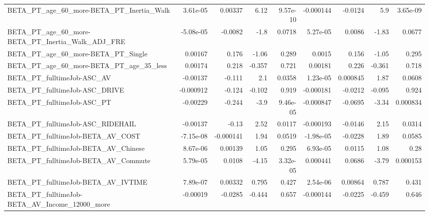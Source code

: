 \begin{tabular}{lrrrrrrrr}
BETA\_PT\_age\_60\_more-BETA\_PT\_Inertia\_Walk           &    3.61e-05 &      0.00337 &     6.12 & 9.57e-10 &  -0.000144 &     -0.0124 &          5.9 &      3.65e-09 \\
BETA\_PT\_age\_60\_more-BETA\_PT\_Inertia\_Walk\_ADJ\_FRE   &   -5.08e-05 &      -0.0082 &     -1.8 &   0.0718 &   5.27e-05 &      0.0086 &        -1.83 &        0.0677 \\
BETA\_PT\_age\_60\_more-BETA\_PT\_Single                 &     0.00167 &        0.176 &    -1.06 &    0.289 &     0.0015 &       0.156 &        -1.05 &         0.295 \\
BETA\_PT\_age\_60\_more-BETA\_PT\_age\_35\_less            &     0.00174 &        0.218 &   -0.357 &    0.721 &    0.00181 &       0.226 &       -0.361 &         0.718 \\
BETA\_PT\_fulltimeJob-ASC\_AV                         &    -0.00137 &       -0.111 &      2.1 &   0.0358 &   1.23e-05 &    0.000845 &         1.87 &        0.0608 \\
BETA\_PT\_fulltimeJob-ASC\_DRIVE                      &   -0.000912 &       -0.124 &   -0.102 &    0.919 &  -0.000181 &     -0.0212 &       -0.095 &         0.924 \\
BETA\_PT\_fulltimeJob-ASC\_PT                         &    -0.00229 &       -0.244 &     -3.9 & 9.46e-05 &  -0.000847 &     -0.0695 &        -3.34 &      0.000834 \\
BETA\_PT\_fulltimeJob-ASC\_RIDEHAIL                   &    -0.00137 &        -0.13 &     2.52 &   0.0117 &  -0.000193 &     -0.0146 &         2.15 &        0.0314 \\
BETA\_PT\_fulltimeJob-BETA\_AV\_COST                   &   -7.15e-08 &    -0.000141 &     1.94 &   0.0519 &  -1.98e-05 &     -0.0228 &         1.89 &        0.0585 \\
BETA\_PT\_fulltimeJob-BETA\_AV\_Chinese                &    8.67e-06 &      0.00139 &     1.05 &    0.295 &   6.93e-05 &      0.0115 &         1.08 &          0.28 \\
BETA\_PT\_fulltimeJob-BETA\_AV\_Commute                &    5.79e-05 &       0.0108 &    -4.15 & 3.32e-05 &   0.000441 &      0.0686 &        -3.79 &      0.000153 \\
BETA\_PT\_fulltimeJob-BETA\_AV\_IVTIME                 &    7.89e-07 &      0.00332 &    0.795 &    0.427 &   2.54e-06 &     0.00864 &        0.787 &         0.431 \\
BETA\_PT\_fulltimeJob-BETA\_AV\_Income\_12000\_more      &    -0.00019 &      -0.0285 &   -0.444 &    0.657 &  -0.000144 &     -0.0225 &       -0.459 &         0.646 \\

\end{tabular}

